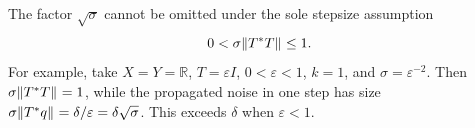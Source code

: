 The factor $\sqrt{\sigma}$ cannot be omitted under the sole stepsize assumption
\[
        0<\sigma \| T^*T \|_{  }\le 1.
\]
For example, take $X=Y=\mathbb{R}$, $T=\varepsilon I$,
$0<\varepsilon<1$, $k=1$, and $\sigma=\varepsilon^{-2}$.  Then
$\sigma\| T^*T \|_{  }=1$, while the propagated noise in one step has size
$\sigma\| T^*q \|_{  }=\delta/\varepsilon
=\delta\sqrt{\sigma}$.  This exceeds $\delta$ when $\varepsilon<1$.
